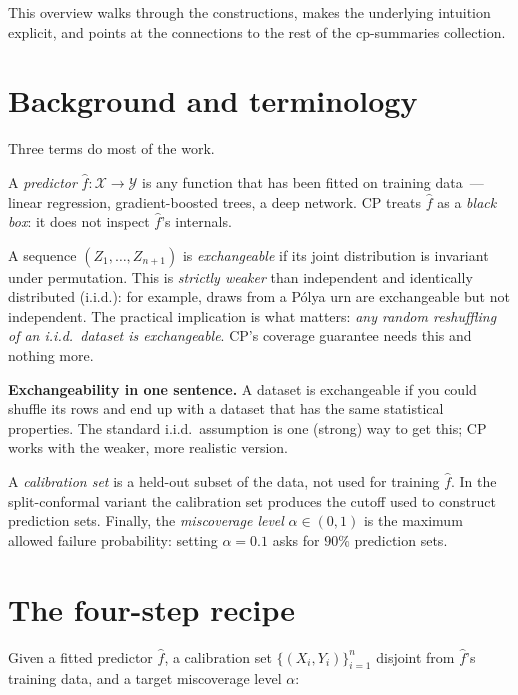 \documentclass[letterpaper,11pt,leqno]{article}
\begin{document}
This overview walks through the constructions, makes the underlying intuition explicit, and points at the connections to the rest of the cp-summaries collection.

\section{Background and terminology}\label{s:background}

Three terms do most of the work.

A \emph{predictor} $\hat{f}: \mathcal{X} \to \mathcal{Y}$ is any function that has been fitted on training data~--- linear regression, gradient-boosted trees, a deep network. CP treats $\hat{f}$ as a \emph{black box}: it does not inspect $\hat{f}$'s internals.

A sequence $(Z_1, \dots, Z_{n+1})$ is \emph{exchangeable} if its joint distribution is invariant under permutation. This is \emph{strictly weaker} than independent and identically distributed (i.i.d.): for example, draws from a P\'olya urn are exchangeable but not independent. The practical implication is what matters: \emph{any random reshuffling of an i.i.d.\ dataset is exchangeable}. CP's coverage guarantee needs this and nothing more.

\begin{definitionexplain}
\textbf{Exchangeability in one sentence.} A dataset is exchangeable if you could shuffle its rows and end up with a dataset that has the same statistical properties. The standard i.i.d.\ assumption is one (strong) way to get this; CP works with the weaker, more realistic version.
\end{definitionexplain}

A \emph{calibration set} is a held-out subset of the data, not used for training $\hat{f}$. In the split-conformal variant the calibration set produces the cutoff used to construct prediction sets. Finally, the \emph{miscoverage level} $\alpha \in (0, 1)$ is the maximum allowed failure probability: setting $\alpha = 0.1$ asks for $90\%$ prediction sets.

\section{The four-step recipe}\label{s:construction}

Given a fitted predictor $\hat{f}$, a calibration set $\{(X_i, Y_i)\}_{i=1}^n$ disjoint from $\hat{f}$'s training data, and a target miscoverage level $\alpha$:
\end{document}
